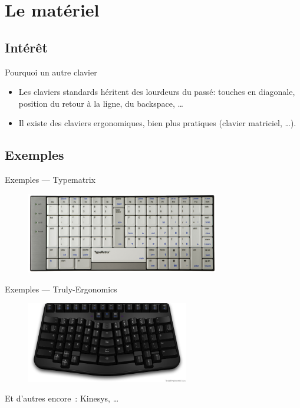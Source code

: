 \section{Le matériel}

\subsection{Intérêt}
\begin{frame}{Pourquoi un autre clavier}
    \begin{itemize}
	\item Les claviers standards héritent des lourdeurs du passé: touches en diagonale, position  du retour à la ligne, du backspace, … \pause
	\item Il existe des claviers ergonomiques, bien plus pratiques (clavier matriciel, …).
    \end{itemize}
\end{frame}

\subsection{Exemples}
\begin{frame}{Exemples — Typematrix}
  \begin{figure}
    \centering
    \includegraphics[height=100pt]{images/2030-dvorak.png}
  \end{figure}
\end{frame}

\begin{frame}{Exemples — Truly-Ergonomics}
  \begin{figure}
    \centering
    \includegraphics[height=100pt]{images/t_e_keyboard.jpg}
  \end{figure}

  Et d’autres encore~: Kinesys, …
\end{frame}
